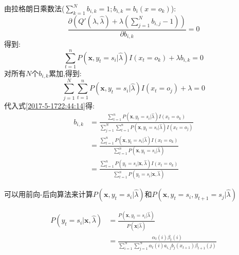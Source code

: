 \documentclass[UTF8,a4paper]{ctexart}%
\begin{document}
            由拉格朗日乘数法($\sum_{k = 1}^N b_{i,k} = 1;b_{i,k} = b_i(x = o_k)$):
            \begin{equation}
              \frac{\partial\left( Q'(\lambda,\hat{\lambda}) + \lambda\left( \sum_{j = 1}^N b_{i,j}  - 1 \right) \right)}{\partial b_{i,k}} = 0
            \end{equation}
            得到:
            \begin{equation}
               \sum_{t = 1}^n P(\bm{x},y_t = s_i|\hat{\lambda})I(x_t = o_k)  + \lambda b_{i,k} = 0
              \label{2017-5-1722:44:14}
            \end{equation}
            对所有$N$个$b_{i,k}$累加,得到:
            \begin{equation}
              \sum_{j = 1}^N \sum_{t = 1}^n P(\bm{x},y_t = s_i|\hat{\lambda})I(x_t = o_j)  + \lambda = 0
            \end{equation}
            代入式\eqref{2017-5-1722:44:14}得:
            \begin{equation}
              \begin{split}
              b_{i,k} &= \frac{\sum_{t = 1}^n P(\bm{x},y_t = s_i|\hat{\lambda})I(x_t = o_k)}
                  {\sum_{j = 1}^N \sum_{t = 1}^n P(\bm{x},y_t = s_i|\hat{\lambda})I(x_t = o_j)}\\
              &= \frac{\sum_{t = 1}^n P(\bm{x},y_t = s_i|\hat{\lambda})I(x_t = o_k)}
              { \sum_{t = 1}^n P(\bm{x},y_t = s_i|\hat{\lambda})}\\
              &= \frac{\sum_{t = 1}^n P(y_t = s_i|\bm{x},\hat{\lambda})I(x_t = o_k)}
              { \sum_{t = 1}^n P(y_t = s_i|\bm{x},\hat{\lambda})}
            \end{split}
            \end{equation}

            可以用前向-后向算法来计算$P(\bm{x},y_t = s_i|\hat{\lambda})$和$P(\bm{x},y_t = s_i , y_{t+1} = s_j|\hat{\lambda})$

            \begin{equation}
              \begin{split}
              P(y_t = s_i|\bm{x},\hat{\lambda}) &= \frac{P(\bm{x},y_t = s_i|\hat{\lambda})}
                {P(\bm{x}|\hat{\lambda})} \\
                &= \frac{\alpha_t(i)\beta_t(i)}{ \sum_{i = 1}^N \sum_{j = 1}^N \alpha_t(i) a_{i,j} b_j(x_{t+1}) \beta_{t+1}(j)}
              \end{split}
            \end{equation}
\end{document}
